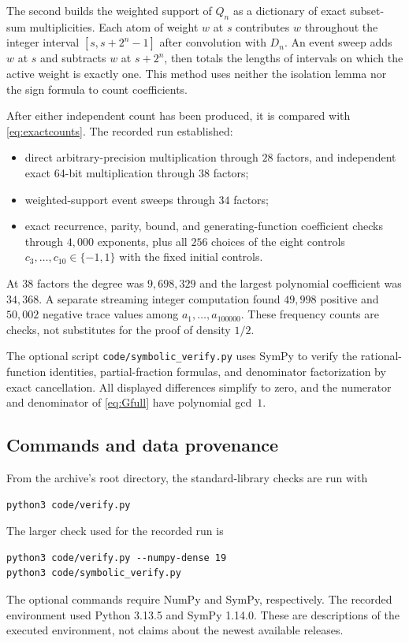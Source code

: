 \documentclass[11pt]{article}
\theoremstyle{definition}\newtheorem{definition}[theorem]{Definition}
\theoremstyle{remark}\newtheorem{remark}[theorem]{Remark}
\begin{document}
The second builds the weighted support of $Q_n$ as a dictionary of exact subset-sum multiplicities. Each atom of weight $w$ at $s$ contributes $w$ throughout the integer interval $[s,s+2^n-1]$ after convolution with $D_n$. An event sweep adds $w$ at $s$ and subtracts $w$ at $s+2^n$, then totals the lengths of intervals on which the active weight is exactly one. This method uses neither the isolation lemma nor the sign formula to count coefficients.

After either independent count has been produced, it is compared with \eqref{eq:exactcounts}. The recorded run established:
\begin{itemize}
 \item direct arbitrary-precision multiplication through $28$ factors, and independent exact 64-bit multiplication through $38$ factors;
 \item weighted-support event sweeps through $34$ factors;
 \item exact recurrence, parity, bound, and generating-function coefficient checks through $4{,}000$ exponents, plus all $256$ choices of the eight controls $c_3,\ldots,c_{10}\in\{-1,1\}$ with the fixed initial controls.
\end{itemize}
At $38$ factors the degree was $9{,}698{,}329$ and the largest polynomial coefficient was $34{,}368$. A separate streaming integer computation found $49{,}998$ positive and $50{,}002$ negative trace values among $a_1,\ldots,a_{100000}$. These frequency counts are checks, not substitutes for the proof of density $1/2$.

The optional script \texttt{code/symbolic\_verify.py} uses SymPy to verify the rational-function identities, partial-fraction formulas, and denominator factorization by exact cancellation. All displayed differences simplify to zero, and the numerator and denominator of \eqref{eq:Gfull} have polynomial gcd~$1$.

\subsection{Commands and data provenance}

From the archive's root directory, the standard-library checks are run with
\begin{lstlisting}
python3 code/verify.py
\end{lstlisting}
The larger check used for the recorded run is
\begin{lstlisting}
python3 code/verify.py --numpy-dense 19
python3 code/symbolic_verify.py
\end{lstlisting}
The optional commands require NumPy and SymPy, respectively. The recorded environment used Python 3.13.5 and SymPy 1.14.0. These are descriptions of the executed environment, not claims about the newest available releases.
\end{document}
